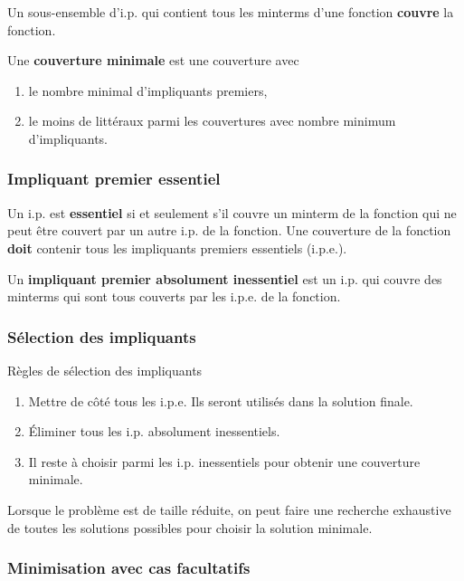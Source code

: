 \documentclass[11pt]{article}
\begin{document}
Un sous-ensemble d'i.p. qui contient tous les minterms d'une fonction
\textbf{couvre} la fonction.

Une \textbf{couverture minimale} est une couverture avec

\begin{enumerate}
\item le nombre minimal d'impliquants premiers,

\item le moins de littéraux parmi les couvertures avec nombre minimum
d'impliquants.
\end{enumerate}

\subsubsection{Impliquant premier essentiel}
\label{sec:orge804cd5}

Un i.p. est \textbf{essentiel} si et seulement s'il couvre un minterm de la
fonction qui ne peut être couvert par un autre i.p. de la fonction.
Une couverture de la fonction \textbf{doit} contenir tous les impliquants
premiers essentiels (i.p.e.).

Un \textbf{impliquant premier absolument inessentiel} est un i.p. qui couvre
des minterms qui sont tous couverts par les i.p.e. de la fonction.

\subsubsection{Sélection des impliquants}
\label{sec:org8d3277d}

Règles de sélection des impliquants

\begin{enumerate}
\item Mettre de côté tous les i.p.e. Ils seront utilisés dans la solution
finale.

\item Éliminer tous les i.p. absolument inessentiels.

\item Il reste à choisir parmi les i.p. inessentiels pour obtenir une
couverture minimale.
\end{enumerate}

Lorsque le problème est de taille réduite, on peut faire une recherche
exhaustive de toutes les solutions possibles pour choisir la solution
minimale.

\subsubsection{Minimisation avec cas facultatifs}
\label{sec:orgb47b19e}
\end{document}
